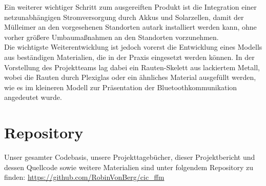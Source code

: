     Ein weiterer wichtiger Schritt zum ausgereiften Produkt ist die Integration einer netzunabhängigen Stromversorgung durch Akkus und Solarzellen, damit der Mülleimer an den vorgesehenen Standorten autark installiert werden kann, ohne vorher größere Umbaumaßnahmen an den Standorten vorzunehmen.\\

    Die wichtigste Weiterentwicklung ist jedoch vorerst die Entwicklung eines Modells aus beständigen Materialien, die in der Praxis eingesetzt werden können. In der Vorstellung des Projektteams lag dabei ein Rauten-Skelett aus lackiertem Metall, wobei die Rauten durch Plexiglas oder ein ähnliches Material ausgefüllt werden, wie es im kleineren Modell zur Präsentation der Bluetoothkommunikation angedeutet wurde.

\chapter{Repository}

    Unser gesamter Codebasis, unsere Projekttagebücher, dieser Projektbericht und dessen Quellcode sowie weitere Materialien sind unter folgendem Repository zu finden: \url{https://github.com/RobinVonBerg/cic_ffm}

    